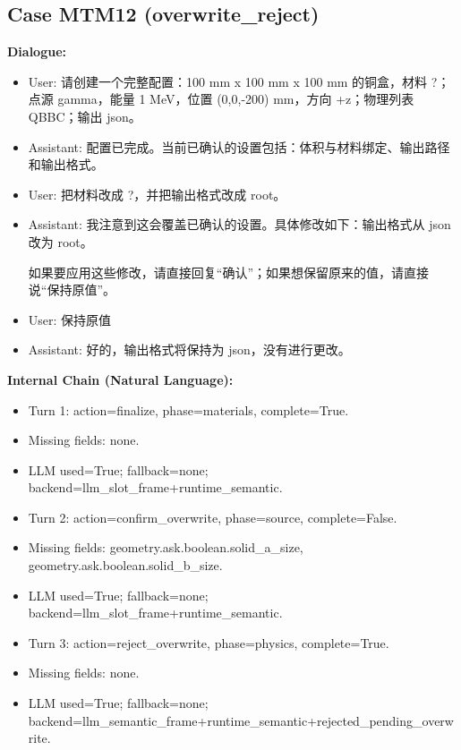 \documentclass[11pt]{ctexart}
\begin{document}
\subsection{Case MTM12 (overwrite\_reject)}
\textbf{Dialogue:}
\begin{itemize}
\item User: 请创建一个完整配置：100 mm x 100 mm x 100 mm 的铜盒，材料 ?；点源 gamma，能量 1 MeV，位置 (0,0,-200) mm，方向 +z；物理列表 QBBC；输出 json。
\item Assistant: 配置已完成。当前已确认的设置包括：体积与材料绑定、输出路径和输出格式。
\item User: 把材料改成 ?，并把输出格式改成 root。
\item Assistant: 我注意到这会覆盖已确认的设置。具体修改如下：输出格式从 json 改为 root。

如果要应用这些修改，请直接回复“确认”；如果想保留原来的值，请直接说“保持原值”。
\item User: 保持原值
\item Assistant: 好的，输出格式将保持为 json，没有进行更改。
\end{itemize}
\textbf{Internal Chain (Natural Language):}
\begin{itemize}
\item Turn 1: action=finalize, phase=materials, complete=True.
\item Missing fields: none.
\item LLM used=True; fallback=none; backend=llm\_slot\_frame+runtime\_semantic.
\item Turn 2: action=confirm\_overwrite, phase=source, complete=False.
\item Missing fields: geometry.ask.boolean.solid\_a\_size, geometry.ask.boolean.solid\_b\_size.
\item LLM used=True; fallback=none; backend=llm\_slot\_frame+runtime\_semantic.
\item Turn 3: action=reject\_overwrite, phase=physics, complete=True.
\item Missing fields: none.
\item LLM used=True; fallback=none; backend=llm\_semantic\_frame+runtime\_semantic+rejected\_pending\_overwrite.
\end{itemize}
\end{document}
